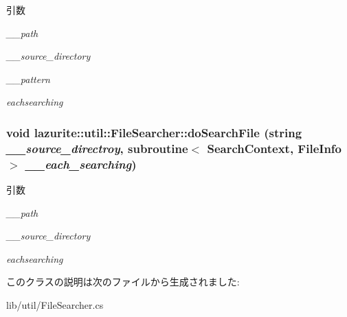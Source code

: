 \begin{DoxyParams}{引数}
\item[{\em \_\-\_\-path}]\item[{\em \_\-\_\-source\_\-directory}]\item[{\em \_\-\_\-pattern}]\item[{\em eachsearching}]\end{DoxyParams}
\hypertarget{classlazurite_1_1util_1_1_file_searcher_a35af502ec9da1c9fd19a02d386a7d5d0}{
\subsubsection[{doSearchFile}]{\setlength{\rightskip}{0pt plus 5cm}void lazurite::util::FileSearcher::doSearchFile (string {\em \_\-\_\-source\_\-directroy}, \/  subroutine$<$ {\bf SearchContext}, FileInfo $>$ {\em \_\-\_\-each\_\-searching})}}
\label{classlazurite_1_1util_1_1_file_searcher_a35af502ec9da1c9fd19a02d386a7d5d0}

\begin{DoxyParams}{引数}
\item[{\em \_\-\_\-path}]\item[{\em \_\-\_\-source\_\-directory}]\item[{\em eachsearching}]\end{DoxyParams}


このクラスの説明は次のファイルから生成されました:\begin{DoxyCompactItemize}
\item 
lib/util/FileSearcher.cs\end{DoxyCompactItemize}
